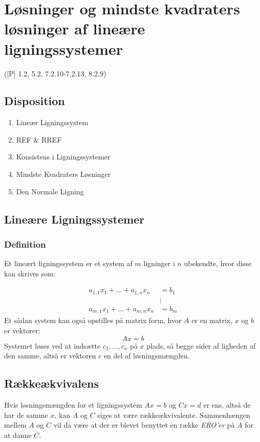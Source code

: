 \newpage
\chapter{Løsninger og mindste kvadraters løsninger af lineære ligningssystemer}
([P] 1.2, 5.2, 7.2.10-7.2.13, 8.2.9)

\section*{Disposition}
\begin{enumerate}
	\item Lineær Ligningssystem
	\item REF \& RREF
	\item Konsistens i Ligningssystemer
	\item Mindste Kvadraters Løsninger
	\item Den Normale Ligning
\end{enumerate}

\section{Lineære Ligningssystemer}

\subsection{Definition}
Et lineært ligningssystem er et system af $m$ ligninger i $n$ ubekendte, hvor 
disse kan skrives som:

\begin{align*}
	a_{1,1}x_1 + \dots + a_{1,n}x_n & = b_1\\
									& \vdots \\
	a_{m,1}x_1 + \dots + a_{m,n}x_n & = b_m
\end{align*}
Et sådan system kan også opstilles på matrix form, hvor $A$ er en matrix, $x$
og $b$ er vektorer:
\[
	Ax = b
\]
Systemet løses ved at indsætte $c_1, \dots, c_n$ på $x$ plads, så begge sider
af ligheden af den samme, altså er vektoren $c$ en del af løsningsmængden.

\section*{Rækkeækvivalens}

Hvis løsningsmængden for et ligningssystem $Ax = b$ og $Cx = d$ er ens, altså
de har de samme $x$, kan $A$ og $C$ siges at være rækkeækvivalente.
Sammenhængen mellem $A$ og $C$ vil da være at der er blevet benyttet en række
\textit{ERO'er} på $A$ for at danne $C$.

